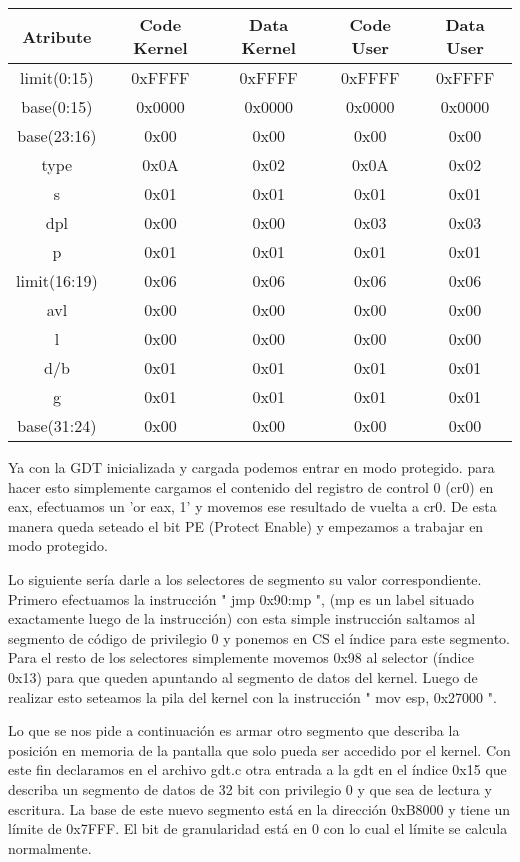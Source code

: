 \documentclass[10pt, a4paper]{article}
\begin{document}
\begin{center}
\begin{tabular}{| c || c || c || c || c |}
	\hline
		Atribute & Code Kernel & Data Kernel & Code User & Data User \\
	\hline
		limit(0:15) & 0xFFFF & 0xFFFF & 0xFFFF & 0xFFFF \\
		base(0:15) & 0x0000 & 0x0000 & 0x0000 & 0x0000 \\
		base(23:16) & 0x00 & 0x00 & 0x00 & 0x00 \\
		type & 0x0A & 0x02 & 0x0A & 0x02 \\
		s & 0x01 & 0x01 & 0x01 & 0x01 \\
		dpl & 0x00 & 0x00 & 0x03 & 0x03 \\
		p & 0x01 & 0x01 & 0x01 & 0x01 \\
		limit(16:19) & 0x06 & 0x06 & 0x06 & 0x06 \\
		avl & 0x00 & 0x00 & 0x00 & 0x00 \\
		l & 0x00 & 0x00 & 0x00 & 0x00 \\
		d/b & 0x01 & 0x01 & 0x01 & 0x01 \\
		g & 0x01 & 0x01 & 0x01 & 0x01 \\
		base(31:24) & 0x00 & 0x00 & 0x00 & 0x00\\
	\hline
	

\end{tabular}
\end{center}

Ya con la GDT inicializada y cargada podemos entrar en modo protegido. para hacer esto simplemente cargamos el
contenido del registro de control 0 (cr0) en eax, efectuamos un 'or eax, 1' y movemos ese resultado de vuelta a
cr0. De esta manera queda seteado el bit PE (Protect Enable) y empezamos a trabajar en modo protegido.

Lo siguiente ser\'ia darle a los selectores de segmento su valor correspondiente. Primero efectuamos la instrucci\'on
" jmp 0x90:mp ", (mp es un label situado exactamente luego de la instrucci\'on) con esta simple instrucci\'on saltamos
al segmento de c\'odigo de privilegio 0 y ponemos en CS el \'indice para este segmento. Para el resto de los selectores
simplemente movemos 0x98 al selector (\'indice 0x13) para que queden apuntando al segmento de datos del kernel. Luego
de realizar esto seteamos la pila del kernel con la instrucci\'on " mov esp, 0x27000 ".

Lo que se nos pide a continuaci\'on es armar otro segmento que describa la posici\'on en memoria de la pantalla que
solo pueda ser accedido por el kernel. Con este fin declaramos en el archivo gdt.c otra entrada a la gdt en el \'indice
0x15 que describa un segmento de datos de 32 bit con privilegio 0 y que sea de lectura y escritura. La base de este
nuevo segmento est\'a en la direcci\'on 0xB8000 y tiene un l\'imite de 0x7FFF. El bit de granularidad est\'a en 0
con lo cual el l\'imite se calcula normalmente.
\end{document}
